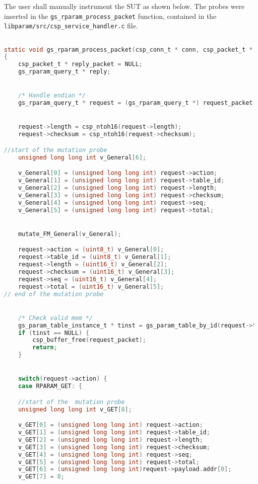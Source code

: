 The user shall manually instrument the SUT as shown below.
The probes were inserted in the \texttt{gs\_rparam\_process\_packet} function, contained in the \texttt{libparam/src/csp\_service\_handler.c} file.
\begin{lstlisting}[language=c]

static void gs_rparam_process_packet(csp_conn_t * conn, csp_packet_t * request_packet)
{
    csp_packet_t * reply_packet = NULL;
    gs_rparam_query_t * reply;


    /* Handle endian */
    gs_rparam_query_t * request = (gs_rparam_query_t *) request_packet->data;


    request->length = csp_ntoh16(request->length);
    request->checksum = csp_ntoh16(request->checksum);

//start of the mutation probe
    unsigned long long int v_General[6];

    v_General[0] = (unsigned long long int) request->action;
    v_General[1] = (unsigned long long int) request->table_id;
    v_General[2] = (unsigned long long int) request->length;
    v_General[3] = (unsigned long long int) request->checksum;
    v_General[4] = (unsigned long long int) request->seq;
    v_General[5] = (unsigned long long int) request->total;


    mutate_FM_General(v_General);

    request->action = (uint8_t) v_General[0];
    request->table_id = (uint8_t) v_General[1];
    request->length = (uint16_t) v_General[2];
    request->checksum = (uint16_t) v_General[3];
    request->seq = (uint16_t) v_General[4];
    request->total = (uint16_t) v_General[5];
// end of the mutation probe


    /* Check valid mem */
    gs_param_table_instance_t * tinst = gs_param_table_by_id(request->table_id);
    if (tinst == NULL) {
        csp_buffer_free(request_packet);
        return;
    }


    switch(request->action) {
	case RPARAM_GET: {

    //start of the  mutation probe
    unsigned long long int v_GET[8];

    v_GET[0] = (unsigned long long int) request->action;
    v_GET[1] = (unsigned long long int) request->table_id;
    v_GET[2] = (unsigned long long int) request->length;
    v_GET[3] = (unsigned long long int) request->checksum;
    v_GET[4] = (unsigned long long int) request->seq;
    v_GET[5] = (unsigned long long int) request->total;
    v_GET[6] = (unsigned long long int)request->payload.addr[0];
    v_GET[7] = 0;


\end{lstlisting}
